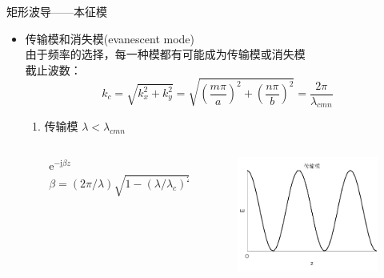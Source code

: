 \begin{frame}{矩形波导——本征模}
    \begin{itemize}
        \item 传输模和消失模(evanescent mode)\\
              由于频率的选择，每一种模都有可能成为传输模或消失模\\
              截止波数：
              $$k_c=\sqrt{k_x^2+k_y^2}=\sqrt{\left(\frac{m\pi}{a}\right)^2+\left(\frac{n\pi}{b}\right)^2}=\frac{2\pi}{\lambda_{cmn}}$$
              \begin{enumerate}
                  \item 传输模 \quad $\lambda<\lambda_{cmn}$\\
                        \begin{columns}
                            \begin{column}{0.5\linewidth}
                                \begin{gather*}
                                    \mathrm{e}^{-\mathrm{j}\beta z}\\
                                    \beta=(2\pi/\lambda)\sqrt{1-(\lambda/\lambda_c)^2}
                                \end{gather*}
                            \end{column}
                            \begin{column}{0.5\linewidth}
                                \begin{figure}
                                    \includegraphics[width=5cm]{Cha6//fig6-10.pdf}
                                \end{figure}
                            \end{column}
                        \end{columns}
                        \saveenum
              \end{enumerate}
    \end{itemize}
\end{frame}

